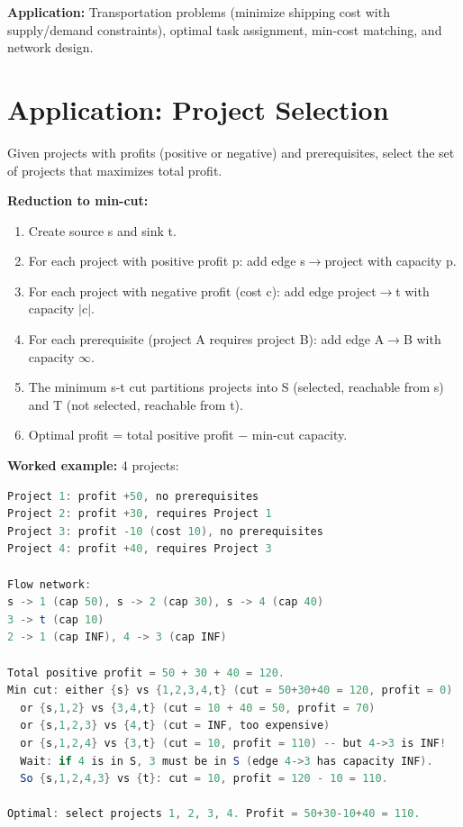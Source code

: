 \textbf{Application:} Transportation problems (minimize shipping cost with supply/demand constraints), optimal task assignment, min-cost matching, and network design.

\section{Application: Project Selection}

Given projects with profits (positive or negative) and prerequisites, select the set of projects that maximizes total profit.

\textbf{Reduction to min-cut:} 
\begin{enumerate}
\item Create source s and sink t.
\item For each project with positive profit p: add edge s$\to$project with capacity p.
\item For each project with negative profit (cost c): add edge project$\to$t with capacity $|$c$|$.
\item For each prerequisite (project A requires project B): add edge A$\to$B with capacity $\infty$.
\item The minimum s-t cut partitions projects into S (selected, reachable from s) and T (not selected, reachable from t).
\item Optimal profit = total positive profit $-$ min-cut capacity.
\end{enumerate}

\textbf{Worked example:} 4 projects:
\begin{lstlisting}[language=Java]
Project 1: profit +50, no prerequisites
Project 2: profit +30, requires Project 1
Project 3: profit -10 (cost 10), no prerequisites
Project 4: profit +40, requires Project 3

Flow network:
s -> 1 (cap 50), s -> 2 (cap 30), s -> 4 (cap 40)
3 -> t (cap 10)
2 -> 1 (cap INF), 4 -> 3 (cap INF)

Total positive profit = 50 + 30 + 40 = 120.
Min cut: either {s} vs {1,2,3,4,t} (cut = 50+30+40 = 120, profit = 0)
  or {s,1,2} vs {3,4,t} (cut = 10 + 40 = 50, profit = 70)
  or {s,1,2,3} vs {4,t} (cut = INF, too expensive)
  or {s,1,2,4} vs {3,t} (cut = 10, profit = 110) -- but 4->3 is INF!
  Wait: if 4 is in S, 3 must be in S (edge 4->3 has capacity INF).
  So {s,1,2,4,3} vs {t}: cut = 10, profit = 120 - 10 = 110.

Optimal: select projects 1, 2, 3, 4. Profit = 50+30-10+40 = 110.
\end{lstlisting}

